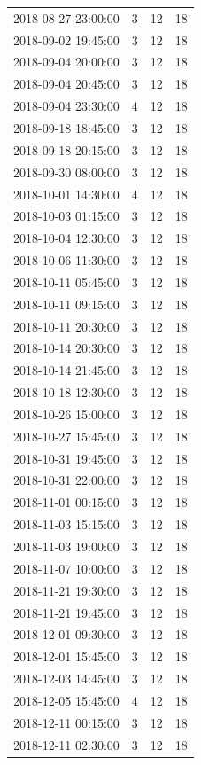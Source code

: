\begin{tabular}{lrrr}
2018-08-27 23:00:00 & 3 & 12 & 18 \\
2018-09-02 19:45:00 & 3 & 12 & 18 \\
2018-09-04 20:00:00 & 3 & 12 & 18 \\
2018-09-04 20:45:00 & 3 & 12 & 18 \\
2018-09-04 23:30:00 & 4 & 12 & 18 \\
2018-09-18 18:45:00 & 3 & 12 & 18 \\
2018-09-18 20:15:00 & 3 & 12 & 18 \\
2018-09-30 08:00:00 & 3 & 12 & 18 \\
2018-10-01 14:30:00 & 4 & 12 & 18 \\
2018-10-03 01:15:00 & 3 & 12 & 18 \\
2018-10-04 12:30:00 & 3 & 12 & 18 \\
2018-10-06 11:30:00 & 3 & 12 & 18 \\
2018-10-11 05:45:00 & 3 & 12 & 18 \\
2018-10-11 09:15:00 & 3 & 12 & 18 \\
2018-10-11 20:30:00 & 3 & 12 & 18 \\
2018-10-14 20:30:00 & 3 & 12 & 18 \\
2018-10-14 21:45:00 & 3 & 12 & 18 \\
2018-10-18 12:30:00 & 3 & 12 & 18 \\
2018-10-26 15:00:00 & 3 & 12 & 18 \\
2018-10-27 15:45:00 & 3 & 12 & 18 \\
2018-10-31 19:45:00 & 3 & 12 & 18 \\
2018-10-31 22:00:00 & 3 & 12 & 18 \\
2018-11-01 00:15:00 & 3 & 12 & 18 \\
2018-11-03 15:15:00 & 3 & 12 & 18 \\
2018-11-03 19:00:00 & 3 & 12 & 18 \\
2018-11-07 10:00:00 & 3 & 12 & 18 \\
2018-11-21 19:30:00 & 3 & 12 & 18 \\
2018-11-21 19:45:00 & 3 & 12 & 18 \\
2018-12-01 09:30:00 & 3 & 12 & 18 \\
2018-12-01 15:45:00 & 3 & 12 & 18 \\
2018-12-03 14:45:00 & 3 & 12 & 18 \\
2018-12-05 15:45:00 & 4 & 12 & 18 \\
2018-12-11 00:15:00 & 3 & 12 & 18 \\
2018-12-11 02:30:00 & 3 & 12 & 18 \\

\end{tabular}

